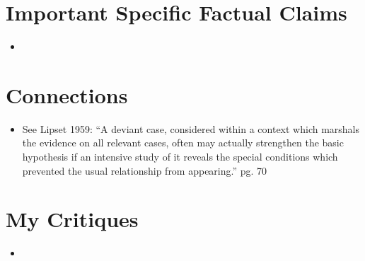 \documentclass[12pt]{article}
\begin{document}
\section{Important Specific Factual Claims}

\begin{itemize}[leftmargin=*, itemsep=4pt]
    \item
\end{itemize}


\section{Connections}

\begin{itemize}
    \item See Lipset 1959: ``A deviant case, considered within a context which marshals the evidence on all relevant cases, often may actually strengthen the basic hypothesis if an intensive study of it reveals the special conditions which prevented the usual relationship from appearing.'' pg. 70
\end{itemize}


\section{My Critiques}

\begin{itemize}
    \item
\end{itemize}
\end{document}
